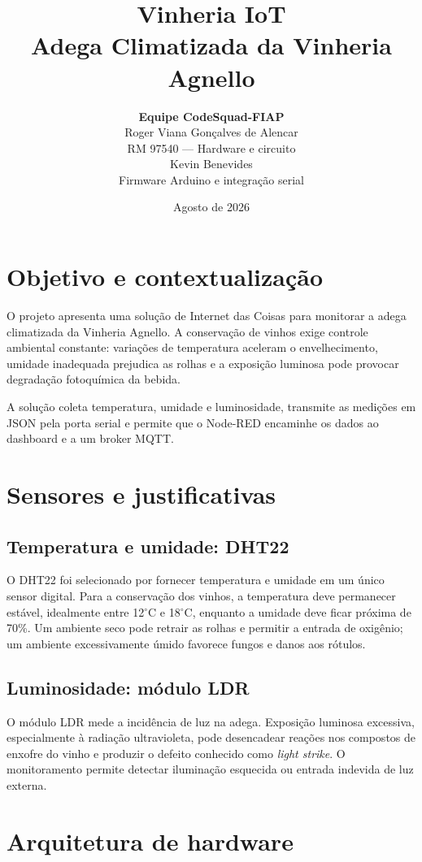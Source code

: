 \documentclass[12pt,a4paper]{article}
\title{\textbf{Vinheria IoT}\\Adega Climatizada da Vinheria Agnello}
\author{
  \textbf{Equipe CodeSquad-FIAP}\\
  Roger Viana Gonçalves de Alencar\\
  {\small RM 97540 --- Hardware e circuito}\\
  Kevin Benevides\\
  {\small Firmware Arduino e integração serial}
}
\date{Agosto de 2026}
\begin{document}
\maketitle
\newpage

\section{Objetivo e contextualização}

O projeto apresenta uma solução de Internet das Coisas para monitorar a adega
climatizada da Vinheria Agnello. A conservação de vinhos exige controle
ambiental constante: variações de temperatura aceleram o envelhecimento,
umidade inadequada prejudica as rolhas e a exposição luminosa pode provocar
degradação fotoquímica da bebida.

A solução coleta temperatura, umidade e luminosidade, transmite as medições em
JSON pela porta serial e permite que o Node-RED encaminhe os dados ao dashboard
e a um broker MQTT.

\section{Sensores e justificativas}

\subsection{Temperatura e umidade: DHT22}

O DHT22 foi selecionado por fornecer temperatura e umidade em um único sensor
digital. Para a conservação dos vinhos, a temperatura deve permanecer estável,
idealmente entre 12\(^{\circ}\)C e 18\(^{\circ}\)C, enquanto a umidade deve ficar
próxima de 70\%. Um ambiente seco pode retrair as rolhas e permitir a entrada
de oxigênio; um ambiente excessivamente úmido favorece fungos e danos aos
rótulos.

\subsection{Luminosidade: módulo LDR}

O módulo LDR mede a incidência de luz na adega. Exposição luminosa excessiva,
especialmente à radiação ultravioleta, pode desencadear reações nos compostos
de enxofre do vinho e produzir o defeito conhecido como \textit{light strike}.
O monitoramento permite detectar iluminação esquecida ou entrada indevida de
luz externa.

\section{Arquitetura de hardware}
\end{document}

